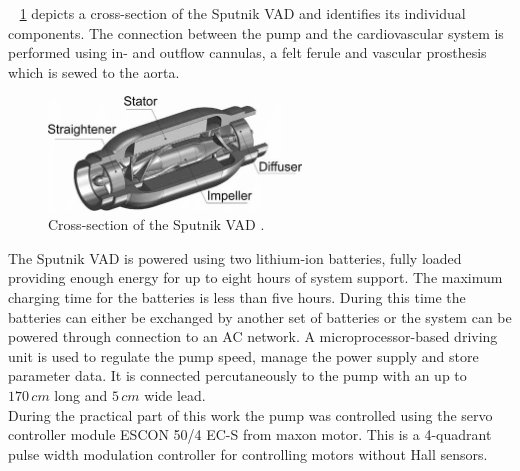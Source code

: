 \figurename~ \ref{fig:sput_cross} depicts a cross-section of the Sputnik VAD and identifies its individual components.
The connection between the pump and the cardiovascular system is performed using in- and outflow cannulas, a felt ferule and vascular prosthesis which is sewed to the aorta. \cite{Sputnik1}
\begin{figure}[ht]
  \centering
  \includegraphics[width=0.6\textwidth]{images/sputnik_cross.png}
  \caption[Cross-section of Sputnik VAD \cite{Sputnik6}]{Cross-section of the Sputnik VAD \cite{Sputnik6}.}
  \label{fig:sput_cross}
\end{figure}
The Sputnik VAD is powered using two lithium-ion batteries, fully loaded providing enough energy for up to eight hours of system support. The maximum charging time for the batteries is less than five hours. During this time the batteries can either be exchanged by another set of batteries or the system can be powered through connection to an AC network. A microprocessor-based driving unit is used to regulate the pump speed, manage the power supply and store parameter data. It is connected percutaneously to the pump with an up to $170\, cm$ long and $5\, cm$ wide lead. \cite{Sputnik1}
\\During the practical part of this work the pump was controlled using the servo controller module ESCON 50/4 EC-S from maxon motor. This is a 4-quadrant pulse width modulation controller for controlling motors without Hall sensors.

